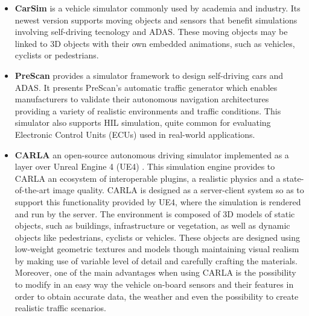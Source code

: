 \begin{itemize}
	
	
	\item \textbf{CarSim} \cite{benekohal1988carsim} is a vehicle simulator commonly used by academia and industry. Its newest version supports moving objects and sensors that benefit simulations involving self-driving tecnology and ADAS. These moving objects may be linked to 3D objects with their own embedded animations, such as vehicles, cyclists or pedestrians.
	
	\item \textbf{PreScan} \cite{tideman2013simulation} provides a simulator framework to design self-driving cars and \ac{ADAS}. It presents PreScan's automatic traffic generator which enables manufacturers to validate their autonomous navigation architectures providing a variety of realistic environments and traffic conditions. This simulator also supports HIL simulation, quite common for evaluating Electronic Control Units (ECUs) used in real-world applications.
	
	\item \textbf{\ac{CARLA}} \cite{dosovitskiy2017carla} an open-source autonomous driving simulator implemented as a layer over Unreal Engine 4 (UE4) \cite{sanders2016introduction}. This simulation engine provides to CARLA an ecosystem of interoperable plugins, a realistic physics and a state-of-the-art image quality. CARLA is designed as a server-client system so as to support this functionality provided by UE4, where the simulation is rendered and run by the server. The environment is composed of 3D models of static objects, such as buildings, infrastructure or vegetation, as well as dynamic objects like pedestrians, cyclists or vehicles. These objects are designed using low-weight geometric textures and models though maintaining visual realism by making use of variable level of detail and carefully crafting the materials. Moreover, one of the main advantages when using CARLA is the possibility to modify in an easy way the vehicle on-board sensors and their features in order to obtain accurate data, the weather and even the possibility to create realistic traffic scenarios.
	

\end{itemize}

